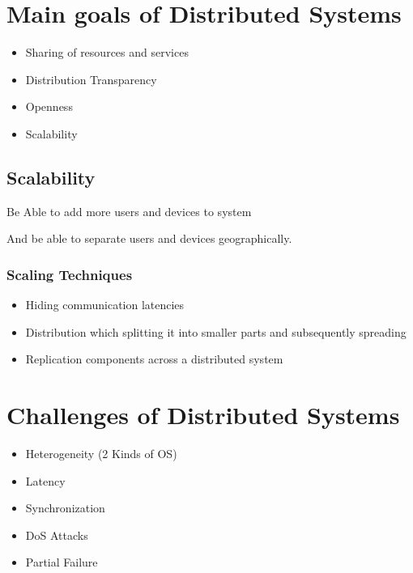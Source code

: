 \documentclass{article}
\begin{document}
\section{Main goals of Distributed Systems}
\begin{itemize}
    \item Sharing of resources and services
    \item Distribution Transparency
    \item Openness
    \item Scalability
\end{itemize}

\subsection{Scalability}

Be Able to add more users and devices to system

And be able to separate users and devices geographically.

\subsubsection{Scaling Techniques}

\begin{itemize}
    \item Hiding communication latencies
    \item Distribution which splitting it into smaller parts and subsequently spreading
    \item Replication components across a distributed system
\end{itemize}


\section{Challenges of Distributed Systems}
\begin{itemize}
    \item Heterogeneity (2 Kinds of OS)
    \item Latency
    \item Synchronization
    \item DoS Attacks
    \item Partial Failure
\end{itemize}
\end{document}
